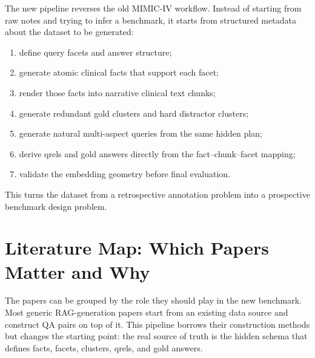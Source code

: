 \documentclass[11pt,a4paper]{article}
\begin{document}
The new pipeline reverses the old MIMIC-IV workflow. Instead of starting from raw notes and trying to infer a benchmark, it starts from structured metadata about the dataset to be generated:

\begin{enumerate}[leftmargin=*]
	\item define query facets and answer structure;
	\item generate atomic clinical facts that support each facet;
	\item render those facts into narrative clinical text chunks;
	\item generate redundant gold clusters and hard distractor clusters;
	\item generate natural multi-aspect queries from the same hidden plan;
	\item derive qrels and gold answers directly from the fact--chunk--facet mapping;
	\item validate the embedding geometry before final evaluation.
\end{enumerate}

This turns the dataset from a retrospective annotation problem into a prospective benchmark design problem.

\section{Literature Map: Which Papers Matter and Why}

The papers can be grouped by the role they should play in the new benchmark. Most generic RAG-generation papers start from an existing data source and construct QA pairs on top of it. This pipeline borrows their construction methods but changes the starting point: the real source of truth is the hidden schema that defines facts, facets, clusters, qrels, and gold answers.
\end{document}
